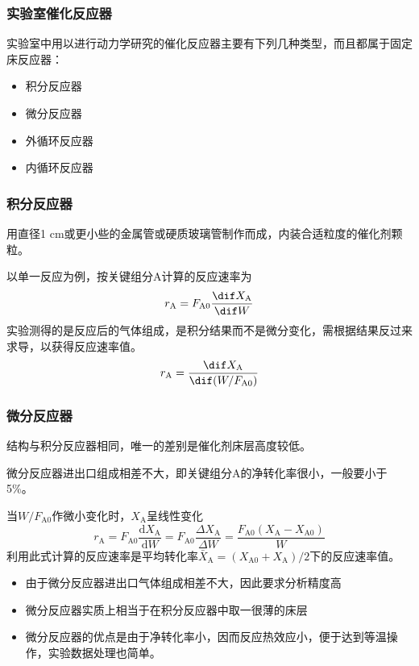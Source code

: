 \begin{frame}
    \frametitle{实验室催化反应器}

    实验室中用以进行动力学研究的催化反应器主要有下列几种类型，而且都属于固定床反应器：
    \begin{itemize}
        \item 积分反应器
        \item 微分反应器
        \item 外循环反应器
        \item 内循环反应器
    \end{itemize}

\end{frame}



\begin{frame}
    \frametitle{积分反应器}

    用直径1 cm或更小些的金属管或硬质玻璃管制作而成，内装合适粒度的催化剂颗粒。

    以单一反应为例，按关键组分A计算的反应速率为
    \[
        r_\mathrm{A} = F_\mathrm{A0}\frac{\dif X_\mathrm{A}}{\dif W}
    \]
    实验测得的是反应后的气体组成，是积分结果而不是微分变化，需根据结果反过来求导，以获得反应速率值。
    \[
        r_\mathrm{A} = \frac{\dif X_\mathrm{A}}{\dif (W/F_\mathrm{A0})}
    \]

\end{frame}



\begin{frame}
    \frametitle{微分反应器}

    结构与积分反应器相同，唯一的差别是催化剂床层高度较低。

    微分反应器进出口组成相差不大，即关键组分A的净转化率很小，一般要小于5\%。

    当$W/F_\mathrm{A0}$作微小变化时，$X_\mathrm{A}$呈线性变化
    \[
        r_{\mathrm{A}}=F_{\mathrm{A} 0} \frac{\mathrm{d} X_{\mathrm{A}}}{\mathrm{d} W}=F_{\mathrm{A} 0} \frac{\Delta X_{\mathrm{A}}}{\Delta W}=\frac{F_{\mathrm{A} 0}(X_{\mathrm{A}}-X_{\mathrm{A} 0})}{W}
    \]
    利用此式计算的反应速率是平均转化率$\bar{X}_{\mathrm{A}}=(X_{\mathrm{A} 0}+X_{\mathrm{A}}) / 2$下的反应速率值。
    \begin{itemize}
        \item 由于微分反应器进出口气体组成相差不大，因此要求分析精度高
        \item 微分反应器实质上相当于在积分反应器中取一很薄的床层
        \item 微分反应器的优点是由于净转化率小，因而反应热效应小，便于达到等温操作，实验数据处理也简单。
    \end{itemize}

\end{frame}




